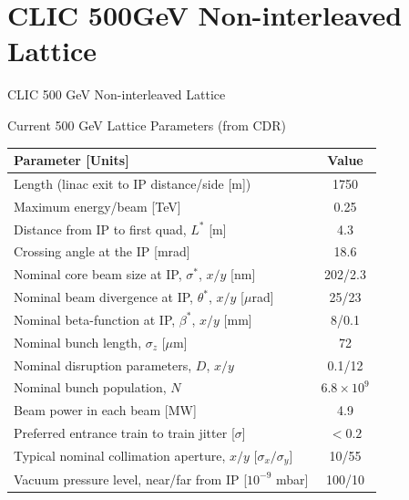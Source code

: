 \documentclass{beamer}
\begin{document}
\section{CLIC 500GeV Non-interleaved Lattice}
\begin{frame}
 \color{blue}\Large CLIC 500 GeV Non-interleaved Lattice
\end{frame}
\begin{frame}{Current 500 GeV Lattice Parameters (from CDR)}
\begin{center}
 \begin{tabular}{|l|c|}\hline\hline
  \textbf{Parameter [Units]} & \textbf{Value}\\\hline
  Length (linac exit to IP distance/side [m]) & 1750\\
  Maximum energy/beam [TeV] & 0.25\\
  Distance from IP to first quad, $L^*$ [m] & 4.3\\
  Crossing angle at the IP [mrad] & 18.6\\
  Nominal core beam size at IP, $\sigma^*$, $x/y$ [nm] & 202/2.3\\
  Nominal beam divergence at IP, $\theta^*$, $x/y$ [$\mu$rad] & 25/23\\
  Nominal beta-function at IP, $\beta^*$, $x/y$ [mm] & 8/0.1\\
  Nominal bunch length, $\sigma_z$ [$\mu$m] & 72\\
  Nominal disruption parameters, $D$, $x/y$ & 0.1/12\\
  Nominal bunch population, $N$ & $6.8\times10^9$\\
  Beam power in each beam [MW] & 4.9\\
  Preferred entrance train to train jitter [$\sigma$] & $<0.2$\\
  Typical nominal collimation aperture, $x/y$ [$\sigma_x/\sigma_y$] & 10/55\\
  Vacuum pressure level, near/far from IP [$10^{-9}$ mbar] & 100/10\\\hline
 \end{tabular}
 \end{center}
\end{frame}
\end{document}
